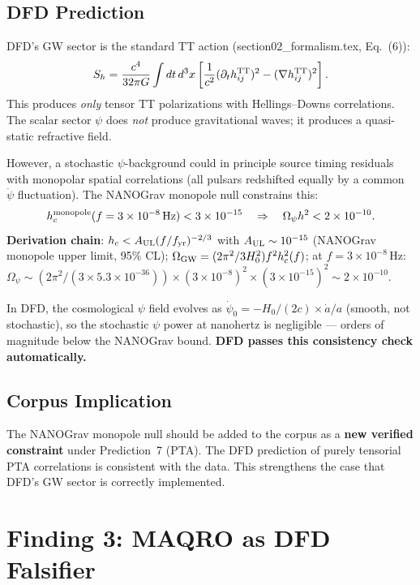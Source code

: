 \documentclass[11pt]{article}
\newcommand{\ee}[1]{\times 10^{#1}}
\begin{document}
\subsection{DFD Prediction}

DFD's GW sector is the standard TT action (section02\_formalism.tex,
Eq.~(6)):
\begin{equation}
S_h = \frac{c^4}{32\pi G}\int dt\,d^3x\left[
\frac{1}{c^2}(\partial_t h_{ij}^{\rm TT})^2
- (\nabla h_{ij}^{\rm TT})^2\right].
\end{equation}
This produces \emph{only} tensor TT polarizations with Hellings--Downs
correlations. The scalar sector $\psi$ does \emph{not} produce
gravitational waves; it produces a quasi-static refractive field.

However, a stochastic $\psi$-background could in principle source
timing residuals with monopolar spatial correlations (all pulsars
redshifted equally by a common $\dot{\psi}$ fluctuation). The NANOGrav
monopole null constrains this:
\begin{equation}
h_c^{\rm monopole}(f = 3\ee{-8}\,\text{Hz}) < 3\ee{-15}
\quad \Rightarrow \quad
\Omega_\psi h^2 < 2\ee{-10}.
\end{equation}
\textbf{Derivation chain}: $h_c < A_{\rm UL}(f/f_{\rm yr})^{-2/3}$ with
$A_{\rm UL} \sim 10^{-15}$ (NANOGrav monopole upper limit, 95\% CL);
$\Omega_{\rm GW} = (2\pi^2/3H_0^2) f^2 h_c^2(f)$; at $f = 3\ee{-8}\,$Hz:
$\Omega_\psi \sim (2\pi^2/(3 \times 5.3\ee{-36})) \times (3\ee{-8})^2
\times (3\ee{-15})^2 \sim 2\ee{-10}$.

In DFD, the cosmological $\psi$ field evolves as $\dot{\psi}_0 = -H_0/(2c)
\times \dot{a}/a$ (smooth, not stochastic), so the stochastic $\psi$
power at nanohertz is negligible --- orders of magnitude below the
NANOGrav bound. \textbf{DFD passes this consistency check automatically.}

\subsection{Corpus Implication}

The NANOGrav monopole null should be added to the corpus as a
\textbf{new verified constraint} under Prediction~7 (PTA). The DFD
prediction of purely tensorial PTA correlations is consistent with the
data. This strengthens the case that DFD's GW sector is correctly
implemented.


\section{Finding 3: MAQRO as DFD Falsifier}
\label{sec:MAQRO}
\end{document}
